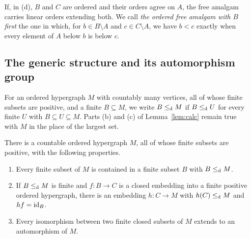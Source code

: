 If, in (d), $B$ and $C$ are ordered and their orders agree on $A$, the free
amalgam carries linear orders extending both. We call \emph{the ordered free
amalgam with $B$ first} the one in which, for $b\in B\setminus A$ and
$c\in C\setminus A$, we have $b<c$ exactly when every element of $A$ below $b$
is below $c$.

\subsection{The generic structure and its automorphism group}

For an ordered hypergraph $M$ with countably many vertices, all of whose finite
subsets are positive, and a finite $B\subseteq M$, we write $B\leq_{\mathrm{d}} M$ if
$B\leq_{\mathrm{d}} U$ for every finite $U$ with $B\subseteq U\subseteq M$. Parts (b) and
(c) of Lemma~\ref{lem:calc} remain true with $M$ in the place of the largest
set.

\begin{proposition}\label{prop:generic}
There is a countable ordered hypergraph $M$, all of whose finite subsets are
positive, with the following properties.
\begin{enumerate}
\item[\textup{(M1)}] Every finite subset of $M$ is contained in a finite subset
 $B$ with $B\leq_{\mathrm{d}} M$.
\item[\textup{(M2)}] If $B\leq_{\mathrm{d}} M$ is finite and $f\colon B\to C$ is a closed
 embedding into a finite positive ordered hypergraph, there is an embedding
 $h\colon C\to M$ with $h(C)\leq_{\mathrm{d}} M$ and $hf=\mathrm{id}_B$.
\item[\textup{(M3)}] Every isomorphism between two finite closed subsets of $M$
 extends to an automorphism of $M$.
\end{enumerate}
\end{proposition}

